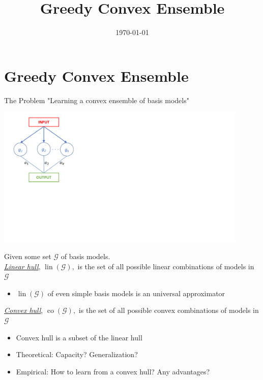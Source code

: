 \documentclass[11pt, xcolor={dvipsnames}]{beamer}
\institute[] 
{

Tan Nguyen (Queensland University of Technology) 
\vspace*{0.3cm}\\ Nan Ye (University of Queensland) 
\vspace*{0.3cm}\\ Peter Bartlett (UC Berkeley)
}
\date{\today}
\title[IJCAI-PRICAI 2020]{Greedy Convex Ensemble}
\author[T Nguyen, N Ye, P Bartlett]{
}
\newcommand{\setG}{{\mathcal G}}
\DeclareMathOperator{\conv}{co}
\DeclareMathOperator{\lin}{lin}
\begin{document}
\begin{frame}
\titlepage 
\end{frame}


\section{Greedy Convex Ensemble} 

\begin{frame}{The Problem}
"Learning a convex ensemble of basis models"

\noindent
\begin{minipage}[t]{0.35\textwidth}
\includegraphics[clip, trim=1cm 8cm 23cm 0cm, width=0.9\textwidth]{fig1}
\end{minipage}%
\begin{minipage}[t]{0.6\textwidth}
\vspace{-3.8cm}
Given some set $\setG$ of basis models.
\vspace{0.1cm}\\
\textit{\underline{Linear hull}}, $\lin(\setG),$ is the set of all possible linear combinations of models in $\setG$
\begin{itemize}
\item $\lin(\setG)$ of even simple basis models is an universal approximator
\end{itemize}

\textit{\underline{Convex hull}}, $\conv(\setG),$ is the set of all possible convex combinations of models in $\setG$
\begin{itemize}
\item Convex hull is a subset of the linear hull
\item Theoretical: Capacity? Generalization? 
\item Empirical: How to learn from a convex hull? Any advantages?
\end{itemize}
\end{minipage}

\end{frame}
\end{document}
